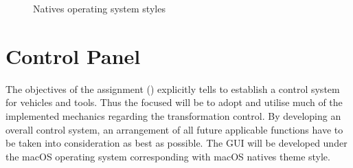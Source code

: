 \begin{figure}[ht]
  \centering
  \hfill
  \hfill
  \caption[Natives operating system styles \cite{qstyle}]{Natives operating system styles \cite{qstyle}}
  \label{fig:qstyle}
\end{figure}


\section{Control Panel}

The objectives of the assignment () explicitly tells to establish a control system for vehicles and tools. Thus the focused will be to adopt and utilise much of the implemented mechanics regarding the transformation control. By developing an overall control system, an arrangement of all future applicable functions have to be taken into consideration as best as possible. The GUI will be developed under the macOS operating system corresponding with macOS natives theme style.

